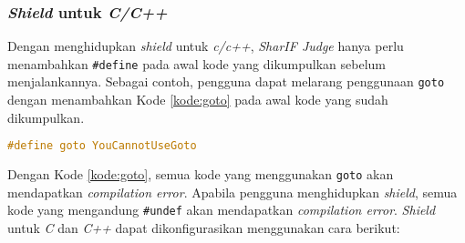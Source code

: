 \subsubsection{\textit{Shield} untuk \textit{C/C++}}
Dengan menghidupkan \textit{shield} untuk \textit{c/c++}, \textit{SharIF Judge} hanya perlu menambahkan \verb|#define| pada awal kode yang dikumpulkan sebelum menjalankannya. Sebagai contoh, pengguna dapat melarang penggunaan \verb|goto| dengan menambahkan Kode \ref{kode:goto} pada awal kode yang sudah dikumpulkan.
\begin{lstlisting}[language=C,caption=Kode \textit{shield} untuk melarang penggunaan goto, label=kode:goto]
#define goto YouCannotUseGoto
\end{lstlisting}
Dengan Kode \ref{kode:goto}, semua kode yang menggunakan \verb|goto| akan mendapatkan \textit{compilation error}. Apabila pengguna menghidupkan \textit{shield}, semua kode yang mengandung \verb|#undef| akan mendapatkan \textit{compilation error}. \textit{Shield} untuk \textit{C} dan \textit{C++} dapat dikonfigurasikan menggunakan cara berikut:

